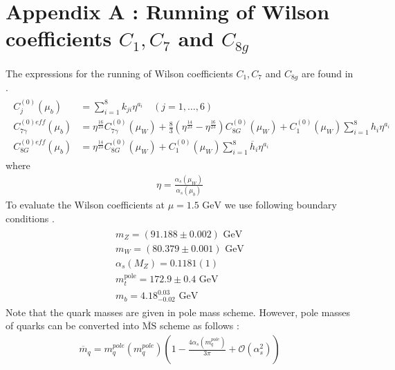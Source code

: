 \appendix
\chapter*{Appendix A : Running of Wilson coefficients $C_1, C_7$ and $C_{8g}$}\label{app:Wilson}

The expressions for the running of Wilson coefficients $C_1, C_7$ and $C_{8g}$ are found in \cite{Buras:1998raa, Manohar:2000dt}.
\begin{eqnarray}
\begin{aligned} C_{j}^{(0)}\left(\mu_{b}\right) &=\sum_{i=1}^{8} k_{j i} \eta^{a_{i}} \quad(j=1, \ldots, 6) \\ C_{7 \gamma}^{(0) e f f}\left(\mu_{b}\right) &=\eta^{\frac{16}{23}} C_{7 \gamma}^{(0)}\left(\mu_{W}\right)+\frac{8}{3}\left(\eta^{\frac{14}{23}}-\eta^{\frac{16}{23}}\right) C_{8 G}^{(0)}\left(\mu_{W}\right)+C_{1}^{(0)}\left(\mu_{W}\right) \sum_{i=1}^{8} h_{i} \eta^{a_{i}} \\ C_{8 G}^{(0) e f f}\left(\mu_{b}\right) &=\eta^{\frac{14}{23}} C_{8 G}^{(0)}\left(\mu_{W}\right)+C_{1}^{(0)}\left(\mu_{W}\right) \sum_{i=1}^{8} \overline{h}_{i} \eta^{a_{i}} \end{aligned}
\end{eqnarray}
where
\begin{eqnarray}
\eta=\frac{\alpha_{s}\left(\mu_{W}\right)}{\alpha_{s}\left(\mu_{b}\right)}
\end{eqnarray}
To evaluate the Wilson coefficients at $\mu=1.5\text{ GeV}$ we use following boundary conditions \cite{Mohr:2015ccw, Tanabashi:2018oca}.
\begin{eqnarray}
\begin{aligned}
m_Z=(91.188\pm 0.002)\mbox{ GeV}\\
m_W=(80.379\pm 0.001)\mbox{ GeV}\\
\alpha_s(M_Z)=0.1181(1)\\
m_t^{\text{pole}}=172.9\pm0.4\mbox{ GeV}\\
m_b=4.18^{0.03}_{-0.02}\mbox{ GeV}
\end{aligned}
\end{eqnarray}
Note that the quark masses are given in pole mass scheme. However, pole masses of quarks can be converted into $\overline{\text{MS}}$ scheme as follows \cite{Tanabashi:2018oca}:
\begin{eqnarray}\label{polemss}
\overline{m}_{q}=m^{pole}_{q}\left(m^{pole}_{q}\right)\left(1-\frac{4 \alpha_{s}\left(m^{pole}_{q}\right)}{3 \pi}+\mathcal{O}\left(\alpha_{s}^{2}\right)\right)
\end{eqnarray}
